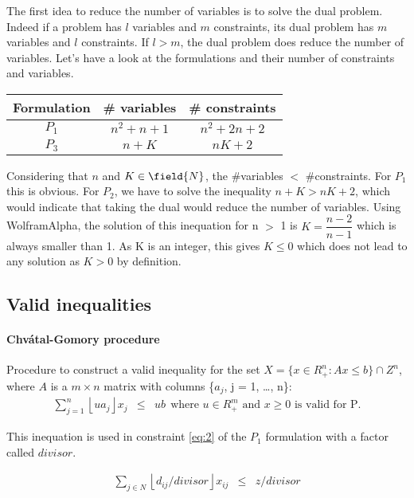 \documentclass[a4paper,10pt]{article}
\begin{document}
The first idea to reduce the number of variables is to solve the dual problem. Indeed if a problem has $l$ variables and $m$ constraints, its dual problem has $m$ variables and $l$ constraints. If $l > m$, the dual problem does reduce the number of variables. Let's have a look at the formulations and their number of constraints and variables.

\begin{tabular}{c|c|c}
    Formulation & \# variables & \# constraints \\
    \hline
    $P_1$ & $n^2 + n + 1$ & $n^2 + 2n + 2$ \\
    $P_3$ & $n + K$ & $nK+2$
\end{tabular}

Considering that $n$ and $K \in \field{N}$, the \#variables $<$ \#constraints. For $P_1$ this is obvious. For $P_2$, we have to solve the inequality $n + K > nK + 2$, which would indicate that taking the dual would reduce the number of variables. Using WolframAlpha, the solution of this inequation for n $>$ 1 is $K = \dfrac{n-2}{n-1}$ which is always smaller than 1. As K is an integer, this gives $K \leq 0$ which does not lead to any solution as $K > 0$ by definition. 

\subsection{Valid inequalities}

\paragraph{Chv\'atal-Gomory procedure}

Procedure to construct a valid inequality for the set $ X = \{x \in R^n_{+}: Ax \leq b \} \cap Z^n$, where $A$ is a $m \times n$ matrix with columns \{$a_j$, j = 1, \ldots, n\}:	
\begin{eqnarray*}
    \sum_{j=1}^n \left \lfloor{ua_j}\right \rfloor x_j & \leq & ub ~~ \text{where $u \in R^m_{+}$ and $x \geq 0$ is valid for P.}
\end{eqnarray*}

This inequation is used in constraint \ref{eq:2} of the $P_1$ formulation with a factor called $divisor$.
 
	\begin{eqnarray}
	 \sum_{j \in N} \left \lfloor{d_{ij}/divisor}\right \rfloor x_{ij} &\leq& z/divisor \label{eq:2_VI}
	\end{eqnarray}
\end{document}
